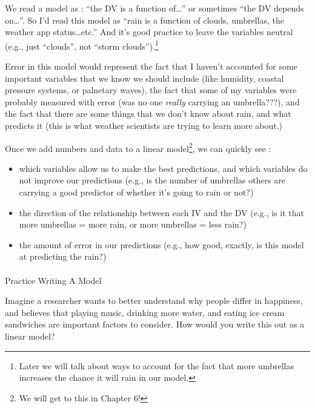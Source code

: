 \documentclass[
  letterpaper,
  DIV=11,
  numbers=noendperiod,
  oneside]{scrreprt}
\makeatletter
\let\oldparagraph\paragraph
\renewcommand{\paragraph}{
    \@ifstar
      \xxxParagraphStar
      \xxxParagraphNoStar
  }
\newcommand{\xxxParagraphStar}[1]{\oldparagraph*{#1}\mbox{}}
\newcommand{\xxxParagraphNoStar}[1]{\oldparagraph{#1}\mbox{}}
\makeatother
\begin{document}
We read a model as : ``the DV is a function of\ldots{}'' or sometimes
``the DV depends on\ldots{}''. So I'd read this model as ``rain is a
function of clouds, umbrellas, the weather app status\ldots etc.'' And
it's good practice to leave the variables neutral (e.g., just
``clouds'', not ``storm clouds'').\footnote{Later we will talk about
  ways to account for the fact that more umbrellas increases the chance
  it will rain in our model.}

Error in this model would represent the fact that I haven't accounted
for some important variables that we know we should include (like
humidity, coastal pressure systems, or palnetary waves), the fact that
some of my variables were probably measured with error (was no one
\emph{really} carrying an umbrella???), and the fact that there are some
things that we don't know about rain, and what predicts it (this is what
weather scientists are trying to learn more about.)

Once we add numbers and data to a linear model\footnote{We will get to
  this in Chapter 6!}, we can quickly see :

\begin{itemize}
\item
  which variables allow us to make the best predictions, and which
  variables do not improve our predictions (e.g., is the number of
  umbrellas others are carrying a good predictor of whether it's going
  to rain or not?)
\item
  the direction of the relationship between each IV and the DV (e.g., is
  it that more umbrellas = more rain, or more umbrellas = less rain?)
\item
  the amount of error in our predictions (e.g., how good, exactly, is
  this model at predicting the rain?)
\end{itemize}

\paragraph{Practice Writing A Model}\label{practice-writing-a-model}

Imagine a researcher wants to better understand why people differ in
happiness, and believes that playing music, drinking more water, and
eating ice cream sandwiches are important factors to consider. How would
you write this out as a linear model?
\end{document}
